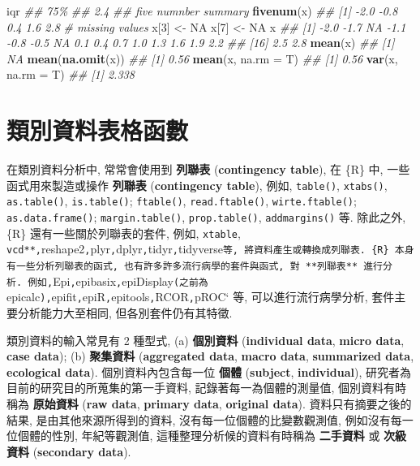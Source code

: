 \documentclass[
]{book}
\newenvironment{Shaded}{\begin{snugshade}}{\end{snugshade}}
\newcommand{\CommentTok}[1]{\textcolor[rgb]{0.56,0.35,0.01}{\textit{#1}}}
\newcommand{\DataTypeTok}[1]{\textcolor[rgb]{0.13,0.29,0.53}{#1}}
\newcommand{\DecValTok}[1]{\textcolor[rgb]{0.00,0.00,0.81}{#1}}
\newcommand{\KeywordTok}[1]{\textcolor[rgb]{0.13,0.29,0.53}{\textbf{#1}}}
\newcommand{\NormalTok}[1]{#1}
\newcommand{\OtherTok}[1]{\textcolor[rgb]{0.56,0.35,0.01}{#1}}
\newcommand{\StringTok}[1]{\textcolor[rgb]{0.31,0.60,0.02}{#1}}
\begin{document}
\begin{Shaded}
\begin{Highlighting}[]
\NormalTok{iqr}
\CommentTok{\#\# 75\% }
\CommentTok{\#\# 2.4}
\CommentTok{\#\# five numnber summary}
\KeywordTok{fivenum}\NormalTok{(x)}
\CommentTok{\#\# [1] {-}2.0 {-}0.8  0.4  1.6  2.8}
\CommentTok{\# missing values}
\NormalTok{x[}\DecValTok{3}\NormalTok{] \textless{}{-}}\StringTok{ }\OtherTok{NA}
\NormalTok{x[}\DecValTok{7}\NormalTok{] \textless{}{-}}\StringTok{ }\OtherTok{NA}
\NormalTok{x}
\CommentTok{\#\#  [1] {-}2.0 {-}1.7   NA {-}1.1 {-}0.8 {-}0.5   NA  0.1  0.4  0.7  1.0  1.3  1.6  1.9  2.2}
\CommentTok{\#\# [16]  2.5  2.8}
\KeywordTok{mean}\NormalTok{(x)}
\CommentTok{\#\# [1] NA}
\KeywordTok{mean}\NormalTok{(}\KeywordTok{na.omit}\NormalTok{(x))}
\CommentTok{\#\# [1] 0.56}
\KeywordTok{mean}\NormalTok{(x, }\DataTypeTok{na.rm =}\NormalTok{ T)}
\CommentTok{\#\# [1] 0.56}
\KeywordTok{var}\NormalTok{(x, }\DataTypeTok{na.rm =}\NormalTok{ T)}
\CommentTok{\#\# [1] 2.338}
\end{Highlighting}
\end{Shaded}

\hypertarget{ux985eux5225ux8cc7ux6599ux8868ux683cux51fdux6578}{%
\section{類別資料表格函數}\label{ux985eux5225ux8cc7ux6599ux8868ux683cux51fdux6578}}

在類別資料分析中,
常常會使用到
\textbf{列聯表}
(\textbf{contingency table}),
在 \{R\} 中, 一些函式用來製造或操作
\textbf{列聯表}
(\textbf{contingency table}),
例如,
\texttt{table()},
\texttt{xtabs()},
\texttt{as.table()},
\texttt{is.table()};
\texttt{ftable()},
\texttt{read.ftable()},
\texttt{wirte.ftable()};
\texttt{as.data.frame()};
\texttt{margin.table()},
\texttt{prop.table()},
\texttt{addmargins()}
等.
除此之外,
\{R\} 還有一些關於列聯表的套件,
例如,
\texttt{xtable},
\texttt{vcd**,}reshape2\texttt{,}plyr\texttt{,}dplyr\texttt{,}tidyr\texttt{,}tidyverse\texttt{等,\ 將資料產生或轉換成列聯表.\ \{R\}\ 本身有一些分析列聯表的函式,\ 也有許多許多流行病學的套件與函式,\ 對\ **列聯表**\ 進行分析.\ 例如,}Epi\texttt{,}epibasix\texttt{,}epiDisplay\texttt{(之前為}epicalc\texttt{),}epifit\texttt{,}epiR\texttt{,}epitools\texttt{,}RCOR\texttt{,}pROC`
等,
可以進行流行病學分析,
套件主要分析能力大至相同,
但各別套件仍有其特徵.

類別資料的輸入常見有 2 種型式,
(a)
\textbf{個別資料}
(\textbf{individual data},
\textbf{micro data},
\textbf{case data});
(b)
\textbf{聚集資料}
(\textbf{aggregated data},
\textbf{macro data},
\textbf{summarized data},
\textbf{ecological data}).
個別資料內包含每一位
\textbf{個體}
(\textbf{subject},
\textbf{individual}),
研究者為目前的研究目的所蒐集的第一手資料,
記錄著每一為個體的測量值,
個別資料有時稱為
\textbf{原始資料}
(\textbf{raw data},
\textbf{primary data},
\textbf{original data}).
資料只有摘要之後的結果,
是由其他來源所得到的資料,
沒有每一位個體的比變數觀測值,
例如沒有每一位個體的性別, 年紀等觀測值,
這種整理分析候的資料有時稱為
\textbf{二手資料}
或
\textbf{次級資料}
(\textbf{secondary data}).
\end{document}
